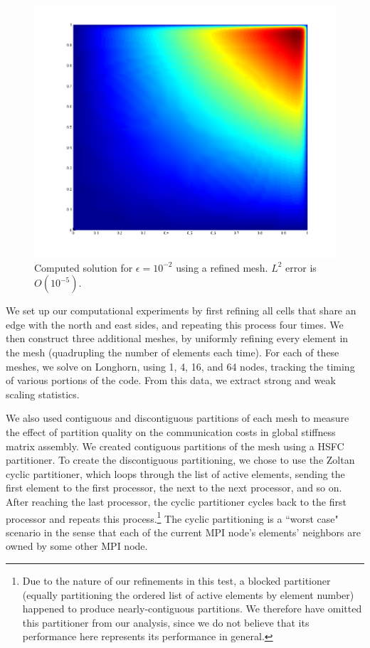 \documentclass{article}
\newcommand{\oneFig}{.45}
\begin{document}
\begin{figure}[h!]
\centering
\includegraphics[scale=\oneFig]{figs/Solution12928nomesh.png}
\caption{Computed solution for $\epsilon=10^{-2}$ using a refined mesh.  $L^2$ error is $O(10^{-5})$.}
\end{figure}

We set up our computational experiments by first refining all cells that share an edge with the north and east sides, and repeating this process four times.   We then construct three additional meshes, by uniformly refining every element in the mesh (quadrupling the number of elements each time).  For each of these meshes, we solve on Longhorn, using 1, 4, 16, and 64 nodes, tracking the timing of various portions of the code.  From this data, we extract strong and weak scaling statistics.  

We also used contiguous and discontiguous partitions of each mesh to measure the effect of partition quality on the communication costs in global stiffness matrix assembly.  We created contiguous partitions of the mesh using a HSFC partitioner.  To create the discontiguous partitioning, we chose to use the Zoltan cyclic partitioner, which loops through the list of active elements, sending the first element to the first processor, the next to the next processor, and so on.  After reaching the last processor, the cyclic partitioner cycles back to the first processor and repeats this process.\footnote{Due to the nature of our refinements in this test, a blocked partitioner (equally partitioning the ordered list of active elements by element number) happened to produce nearly-contiguous partitions.  We therefore have omitted this partitioner from our analysis, since we do not believe that its performance here represents its performance in general.}  The cyclic partitioning is a ``worst case" scenario in the sense that each of the current MPI node's elements' neighbors are owned by some other MPI node.
\end{document}
